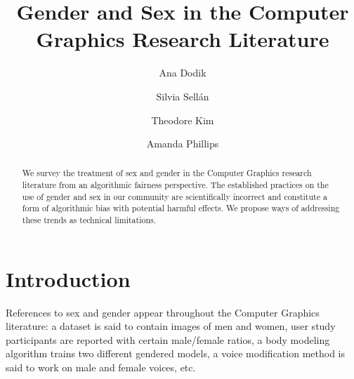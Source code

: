 \documentclass[nonacm,sigconf,review,balance=false]{acmart}
\begin{document}
\title{Gender and Sex in the Computer Graphics Research Literature}

\author{Ana Dodik}

\author{Silvia Sellán}\authornotemark[1]

\author{Theodore Kim}

\author{Amanda Phillips}



\begin{abstract}
    We survey the treatment of sex and gender in the Computer Graphics research
    literature from an algorithmic fairness perspective. The
    established practices on the use of gender and sex in our community are scientifically incorrect and constitute a
    form of algorithmic bias with potential harmful effects. We propose ways of addressing these trends as technical limitations.
\end{abstract}


\maketitle

\vspace{-0.1cm}
\section{Introduction}


References to sex and gender appear throughout the Computer Graphics literature: a dataset is said to contain images of men and women, user study participants are reported with certain male/female ratios, a body modeling algorithm trains two different gendered models, a voice modification method is said to work on male and female voices, etc.



\end{document}
